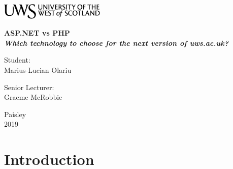 \documentclass[11]{article}
\begin{document}
\begin{titlepage}
	\begin{center}	
		\includegraphics[width = 5cm,height = 1.5cm]{uws_logo.png}\\[5cm]
	
{ \huge \bfseries %
		ASP.NET vs PHP\\ \Large
		 \textit{Which technology to choose for the next version of uws.ac.uk?} \\ 
}
	\vspace{2cm}			
			
		\begin{flushright}
				\large Student:\\
				Marius-Lucian Olariu\\[1cm]
		\end{flushright}
		
	
		\begin{flushleft}
			 \large
				Senior Lecturer: \\
				Graeme McRobbie \\[1cm]
		\end{flushleft}
		
	\vspace{2cm}	
	
		
		\vfill
		
		{\large {Paisley \\ 2019}}
		\end{center}
\end{titlepage}

\newpage

\tableofcontents

\listoffigures

\listoftables

\newpage

\section{Introduction}

\end{document}
